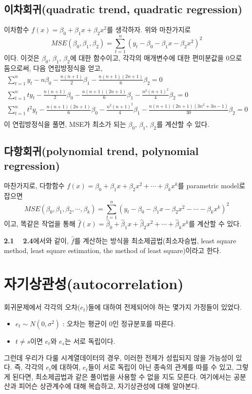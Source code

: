\documentclass{article}
\begin{document}
\subsection{이차회귀(quadratic trend, quadratic regression)}
이차함수 \(f(x)=\beta_0+\beta_1x+\beta_2x^2\)를 생각하자.
위와 마찬가지로
\[MSE(\beta_0,\beta_1,\beta_2)=\sum_{t=1}^n(y_t-\beta_0-\beta_1x-\beta_2x^2)^2\]
이다.
이것은 \(\beta_0\), \(\beta_1\), \(\beta_2\)에 대한 함수이고, 각각의 매개변수에 대한 편미분값을 0으로 둠으로써, 다음 연립방정식을 얻고,
\begin{gather*}
\sum_{t=1}^ny_t-n\beta_0-\frac{n(n+1)}2\beta_1-\frac{n(n+1)(2n+1)}6\beta_2=0\\
\sum_{t=1}^nty_t-\frac{n(n+1)}2\beta_0-\frac{n(n+1)(2n+1)}6\beta_1-\frac{n^2(n+1)^2}4\beta_2=0\\
\sum_{t=1}^nt^2y_t-\frac{n(n+1)(2n+1)}6\beta_0-\frac{n^2(n+1)^2}4\beta_1-\frac{n(n+1)(2n+1)(3n^2+3n-1)}{30}\beta_2=0\\
\end{gather*}
이 연립방정식을 풀면, MSE가 최소가 되는 \(\beta_0\), \(\beta_1\), \(\beta_2\)를 계산할 수 있다.

\subsection{다항회귀(polynomial trend, polynomial regression)}
마찬가지로, 다항함수 \(f(x)=\beta_0+\beta_1x+\beta_2x^2+\cdots+\beta_kx^k\)를 parametric model로 잡으면
\[MSE(\beta_0,\beta_1,\beta_2,\cdots,\beta_k)=\sum_{t=1}^n(y_t-\beta_0-\beta_1x-\beta_2x^2-\cdots-\beta_kx^k)^2\]
이고, 똑같은 작업을 통해 \(\hat f(x)=\hat \beta_0+\hat \beta_1x+\hat \beta_2x^2+\cdots+\hat \beta_kx^k\)를 계산할 수 있다.

\textbf{2.1 ~ 2.4}에서와 같이, \(\hat f\)를 계산하는 방식을 최소제곱법(최소자승법, least square method, least square estimation, the method of least square)이라고 한다.

\section{자기상관성(autocorrelation)}
회귀문제에서 각각의 오차(\(e_t\))들에 대하여 전제되어야 하는 몇가지 가정들이 있었다.
\begin{itemize}
\item
\(e_t\sim N(0,\sigma^2)\) : 오차는 평균이 0인 정규분포를 따른다.
\item
\(t\neq s\)이면 \(e_t\)와 \(e_s\)는 서로 독립이다.
\end{itemize}
그런데 우리가 다룰 시계열데이터의 경우, 이러한 전제가 성립되지 않을 가능성이 있다.
즉, 각각의 \(e_t\)에 대하여, \(e_t\)들이 서로 독립이 아닌 종속의 관계를 따를 수 있고, 그렇게 된다면, 최소제곱법과 같은 풀이법을 사용할 수 없을 지도 모른다.
여기에서는 공분산과 피어슨 상관계수에 대해 복습하고, 자기상관성에 대해 알아본다.
\end{document}
